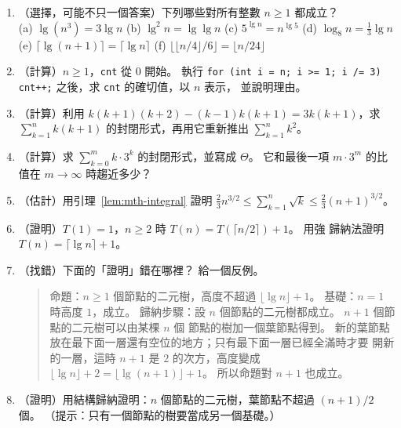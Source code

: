 \begin{enumerate}
\item \label{mth-q-log}（選擇，可能不只一個答案）下列哪些對所有整數 $n \ge 1$ 都成立？\\
(a) $\lg(n^3) = 3 \lg n$ \quad
(b) $\lg^2 n = \lg \lg n$ \quad
(c) $5^{\lg n} = n^{\lg 5}$ \quad
(d) $\log_8 n = \frac13 \lg n$ \\
(e) $\lceil \lg(n + 1) \rceil = \lceil \lg n \rceil$ \quad
(f) $\bigl\lfloor \lfloor n/4 \rfloor / 6 \bigr\rfloor = \lfloor n / 24 \rfloor$

\item \label{mth-q-base3}（計算）$n \ge 1$，\texttt{cnt} 從 $0$ 開始。 執行
\texttt{for (int i = n; i >= 1; i /= 3) cnt++;} 之後，求 \texttt{cnt} 的確切值，以 $n$ 表示，
並說明理由。

\item \label{mth-q-tele}（計算）利用 $k(k+1)(k+2) - (k-1)k(k+1) = 3k(k+1)$，求
$\sum_{k=1}^{n} k(k+1)$ 的封閉形式，再用它重新推出 $\sum_{k=1}^{n} k^2$。

\item \label{mth-q-wgeo}（計算）求 $\sum_{k=0}^{m} k \cdot 3^k$ 的封閉形式，並寫成 $\Theta$。
它和最後一項 $m \cdot 3^m$ 的比值在 $m \to \infty$ 時趨近多少？

\item \label{mth-q-sqrt}（估計）用引理~\ref{lem:mth-integral} 證明
$\frac23 n^{3/2} \le \sum_{k=1}^{n} \sqrt{k} \le \frac23 (n+1)^{3/2}$。

\item \label{mth-q-ceil}（證明）$T(1) = 1$，$n \ge 2$ 時 $T(n) = T(\lceil n/2 \rceil) + 1$。 用強
歸納法證明 $T(n) = \lceil \lg n \rceil + 1$。

\item \label{mth-q-fake}（找錯）下面的「證明」錯在哪裡？ 給一個反例。
\begin{quote}
命題：$n \ge 1$ 個節點的二元樹，高度不超過 $\lfloor \lg n \rfloor + 1$。 基礎：$n = 1$ 時高度
$1$，成立。 歸納步驟：設 $n$ 個節點的二元樹都成立。 $n + 1$ 個節點的二元樹可以由某棵 $n$ 個
節點的樹加一個葉節點得到。 新的葉節點放在最下面一層還有空位的地方；只有最下面一層已經全滿時才要
開新的一層，這時 $n + 1$ 是 $2$ 的次方，高度變成 $\lfloor \lg n \rfloor + 2 = \lfloor \lg(n+1)
\rfloor + 1$。 所以命題對 $n + 1$ 也成立。
\end{quote}

\item \label{mth-q-leaves}（證明）用結構歸納證明：$n$ 個節點的二元樹，葉節點不超過
$(n + 1)/2$ 個。 （提示：只有一個節點的樹要當成另一個基礎。）


\end{enumerate}

